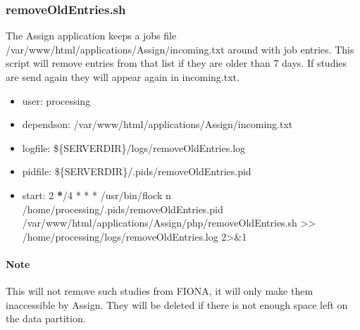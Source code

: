\documentclass[letterpaper,10pt,english]{sphinxmanual}
\begin{document}
\subsubsection{removeOldEntries.sh}
\label{\detokenize{Architecture/scripts/removeOldEntries:removeoldentries-sh}}\label{\detokenize{Architecture/scripts/removeOldEntries::doc}}
\sphinxAtStartPar
The Assign application keeps a jobs file /var/www/html/applications/Assign/incoming.txt around with job entries. This script will remove entries from that list if they are older than 7 days. If studies are send again they will appear again in incoming.txt.
\begin{itemize}
\item {} 
\sphinxAtStartPar
user: processing

\item {} 
\sphinxAtStartPar
depends\sphinxhyphen{}on:
\sphinxhyphen{} /var/www/html/applications/Assign/incoming.txt

\item {} 
\sphinxAtStartPar
log\sphinxhyphen{}file:
\sphinxhyphen{} \$\{SERVERDIR\}/logs/removeOldEntries.log

\item {} 
\sphinxAtStartPar
pid\sphinxhyphen{}file: \$\{SERVERDIR\}/.pids/removeOldEntries.pid

\item {} 
\sphinxAtStartPar
start:
2 {\color{red}\bfseries{}*}/4 * * * /usr/bin/flock \sphinxhyphen{}n /home/processing/.pids/removeOldEntries.pid /var/www/html/applications/Assign/php/removeOldEntries.sh \textgreater{}\textgreater{} /home/processing/logs/removeOldEntries.log 2\textgreater{}\&1

\end{itemize}


\paragraph{Note}
\label{\detokenize{Architecture/scripts/removeOldEntries:note}}
\sphinxAtStartPar
This will not remove such studies from FIONA, it will only make them inaccessible by Assign. They will be deleted if there is not enough space left on the data partition.

\sphinxstepscope
\end{document}
